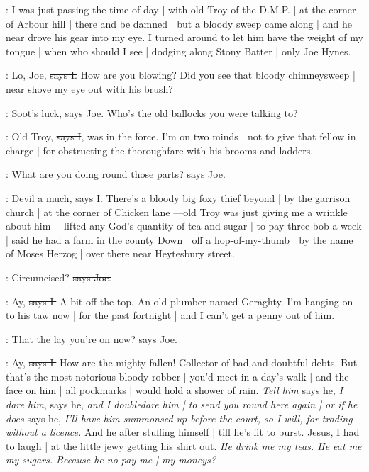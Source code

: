 \Nq:
I was just passing the time of day |
with old Troy of the D.M.P. |
at the corner of Arbour hill |
there and be damned |
but a bloody sweep came along |
and he near drove his gear into my eye.
I turned around
to let him have the weight of my tongue |
when who should I see |
dodging along Stony Batter |
only Joe Hynes.

:
Lo,
Joe,
\sout{says I.}
How are you blowing?
Did you see that bloody chimneysweep |
near shove my eye out with his brush?

\joe:
Soot's luck,
\sout{says Joe.}
Who's the old ballocks you were talking to?

:
Old Troy,
\sout{says I},
was in the force.
I'm on two minds |
not to give that fellow in charge |
for obstructing the thoroughfare
with his brooms and ladders.

\joe:
What are you doing round those parts?
\sout{says Joe.}

:
Devil a much,
\sout{says I.}
There's a bloody big foxy thief beyond |
by the garrison church |
at the corner of Chicken lane%
—old Troy was just giving me a wrinkle about him—%
lifted any God's quantity of tea and sugar |
to pay three bob a week |
said he had a farm in the county Down |
off a hop-of-my-thumb |
by the name of Moses Herzog |
over there near Heytesbury street.

\joe:
Circumcised?
\sout{says Joe.}

:
Ay,
\sout{says I.}
A bit off the top.
An old plumber named Geraghty.
I'm hanging on to his taw now |
for the past fortnight |
and I can't get a penny out of him.

\joe:
That the lay you're on now?
\sout{says Joe.}

:
Ay,
\sout{says I.}
How are the mighty fallen!
Collector of bad and doubtful debts.
But that's the most notorious bloody robber |
you'd meet in a day's walk |
and the face on him |
all pockmarks |
would hold a shower of rain.
\emph{Tell him} says he,
\emph{I dare him},
says he,
\emph{and I doubledare him |
to send you round here again |
or if he does} says he,
\emph{I'll have him summonsed up before the court,
so I will,
for trading without a licence.}
And he after stuffing himself |
till he's fit to burst.
Jesus,
I had to laugh |
at the little jewy getting his shirt out.
\emph{He drink me my teas.
He eat me my sugars.
Because he no pay me |
my moneys?}

